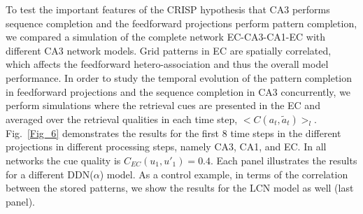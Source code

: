 \documentclass[utf8]{frontiersSCNS} %
\begin{document}
To test the important features of the CRISP hypothesis that CA3 performs sequence completion and the feedforward projections perform pattern completion, we compared a simulation of the complete network EC-CA3-CA1-EC with different CA3 network models.
%
Grid patterns in EC are spatially correlated, which affects the feedforward hetero-association and thus the overall model performance. 
%
In order to study the temporal evolution of the pattern completion in feedforward projections and the sequence completion in CA3 concurrently,  we perform simulations where the retrieval cues are presented in the EC and averaged over the retrieval qualities in each time step, $<C(a_t, \tilde{a}_t)>_l$.
%
Fig.~\ref{Fig_6} demonstrates the results for the first 8 time steps in the different projections in different processing steps, namely CA3, CA1, and EC. In all networks the cue quality is $C_{EC}(u_1, u'_1) = 0.4$.
%
Each panel illustrates the results for a different DDN($\alpha$) model. As a control example, in terms of the correlation between the stored patterns, we show the results for the LCN model as well (last panel). 
%




\end{document}
